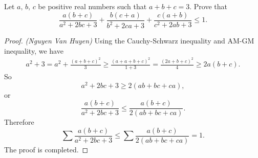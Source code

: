 \documentclass[12pt,a4paper]{book}
\begin{document}
\begin{pro_no_count}
Let $a, \,b,\,c$ be positive real numbers such that $a+b+c=3.$ Prove that
$$\dfrac{a(b+c)}{a^2+2bc+3} + \dfrac{b(c+a)}{b^2+2ca+3} + \dfrac{c(a+b)}{c^2+2ab+3} \le 1.$$
\end{pro_no_count}

\begin{proof}
\textit{(Nguyen Van Huyen)} Using the Cauchy-Schwarz inequality and AM-GM inequality, we have
$$\begin{aligned}
a^2 + 3 = a^2+\frac{(a+b+c)^2}{3} \geqslant \frac{(a+a+b+c)^2}{1+3}  = \frac{(2a+b+c)^2}{4} \geqslant 2a(b+c).
\end{aligned}$$
So
$$a^2+2bc+3 \geqslant 2(ab+bc+ca),$$
or
$$\frac{a(b+c)}{a^2+2bc+3} \leq \frac{a(b+c)}{2(ab+bc+ca)}.$$
Therefore
$$\sum \frac{a(b+c)}{a^2+2bc+3} \leq \sum \frac{a(b+c)}{2(ab+bc+ca)} =1.$$
The proof is completed.
\end{proof}
\end{document}
